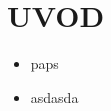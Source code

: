 \chapter{\uppercase{Uvod}}
\label{ch:rand}
\setcounter{page}{1}

\lipsum

\cite{Peiris1970,Massoudi2001}


\begin{itemize}
	\item paps
	\item asdasda
\end{itemize}